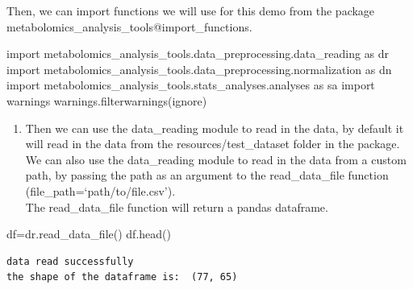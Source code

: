 \documentclass[
  letterpaper,
  DIV=11,
  numbers=noendperiod]{scrartcl}
\newenvironment{Shaded}{\begin{snugshade}}{\end{snugshade}}
\newcommand{\ImportTok}[1]{\textcolor[rgb]{0.00,0.46,0.62}{#1}}
\newcommand{\NormalTok}[1]{\textcolor[rgb]{0.00,0.23,0.31}{#1}}
\newcommand{\OperatorTok}[1]{\textcolor[rgb]{0.37,0.37,0.37}{#1}}
\newcommand{\StringTok}[1]{\textcolor[rgb]{0.13,0.47,0.30}{#1}}
\providecommand{\tightlist}{%
  \setlength{\itemsep}{0pt}\setlength{\parskip}{0pt}}\usepackage{longtable,booktabs,array}
\begin{document}
Then, we can import functions we will use for this demo from the package
metabolomics\_analysis\_tools@import\_functions.

\hypertarget{import_functions}{}
\begin{Shaded}
\begin{Highlighting}[]
\ImportTok{import}\NormalTok{ metabolomics\_analysis\_tools.data\_preprocessing.data\_reading }\ImportTok{as}\NormalTok{ dr}
\ImportTok{import}\NormalTok{ metabolomics\_analysis\_tools.data\_preprocessing.normalization }\ImportTok{as}\NormalTok{ dn}
\ImportTok{import}\NormalTok{ metabolomics\_analysis\_tools.stats\_analyses.analyses }\ImportTok{as}\NormalTok{ sa}
\ImportTok{import}\NormalTok{ warnings}
\NormalTok{warnings.filterwarnings(}\StringTok{\textquotesingle{}ignore\textquotesingle{}}\NormalTok{)}
\end{Highlighting}
\end{Shaded}

\begin{enumerate}
\def\labelenumi{\arabic{enumi}.}
\tightlist
\item
  Then we can use the data\_reading module to read in the data, by
  default it will read in the data from the resources/test\_dataset
  folder in the package.\\
  We can also use the data\_reading module to read in the data from a
  custom path, by passing the path as an argument to the
  read\_data\_file function (file\_path=`path/to/file.csv').\\
  The read\_data\_file function will return a pandas dataframe.
\end{enumerate}

\begin{Shaded}
\begin{Highlighting}[]
\NormalTok{df}\OperatorTok{=}\NormalTok{dr.read\_data\_file()}
\NormalTok{df.head()}
\end{Highlighting}
\end{Shaded}

\begin{verbatim}
data read successfully
the shape of the dataframe is:  (77, 65)
\end{verbatim}
\end{document}
